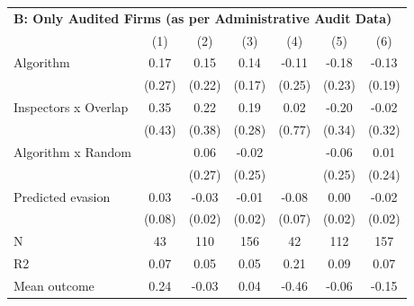 \begin{tabular}{lccc|ccc}
\midrule \multicolumn{7}{l}{\textbf{B: Only Audited Firms (as per Administrative Audit Data)}} \\ \multicolumn{1}{l}{} & (1) & (2) & (3) & (4) & (5) & (6) \\ \midrule

Algorithm   &        0.17         &        0.15         &        0.14         &       -0.11         &       -0.18         &       -0.13         \\
            &      (0.27)         &      (0.22)         &      (0.17)         &      (0.25)         &      (0.23)         &      (0.19)         \\
\addlinespace
Inspectors x Overlap&        0.35         &        0.22         &        0.19         &        0.02         &       -0.20         &       -0.02         \\
            &      (0.43)         &      (0.38)         &      (0.28)         &      (0.77)         &      (0.34)         &      (0.32)         \\
\addlinespace
Algorithm x Random&                     &        0.06         &       -0.02         &                     &       -0.06         &        0.01         \\
            &                     &      (0.27)         &      (0.25)         &                     &      (0.25)         &      (0.24)         \\
\addlinespace
Predicted evasion&        0.03         &       -0.03         &       -0.01         &       -0.08         &        0.00         &       -0.02         \\
            &      (0.08)         &      (0.02)         &      (0.02)         &      (0.07)         &      (0.02)         &      (0.02)         \\
\midrule
N           &          43         &         110         &         156         &          42         &         112         &         157         \\
R2          &        0.07         &        0.05         &        0.05         &        0.21         &        0.09         &        0.07         \\
Mean outcome&        0.24         &       -0.03         &        0.04         &       -0.46         &       -0.06         &       -0.15         \\
\bottomrule \end{tabular}
